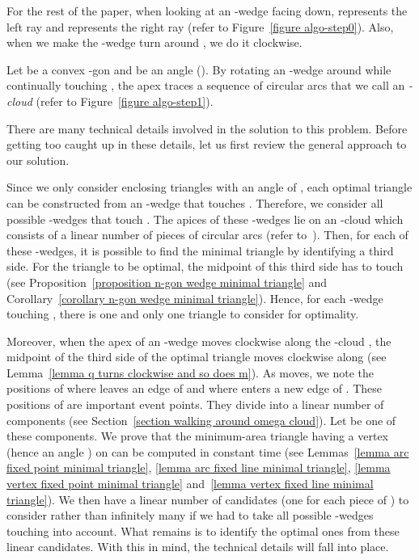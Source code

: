 \documentclass[11pt, oneside]{article}
\begin{document}
For the rest of the paper,
when looking at an -wedge facing down,
 represents the left ray and  represents the right ray
(refer to Figure~\ref{figure algo-step0}).
Also,
when we make the -wedge turn around ,
we do it clockwise.

\begin{definition}[-cloud]
Let  be a convex -gon
and  be an angle 
().
By rotating an -wedge around 
while continually touching ,
the apex traces a sequence of circular arcs
that we call an \emph{-cloud}
(refer to Figure~\ref{figure algo-step1}).
\end{definition}

There are many technical details involved 
in the solution to this problem.
Before getting too caught up in these details,
let us first review the general approach to our solution.

Since we only consider enclosing triangles 
with an angle of , 
each optimal triangle can be constructed 
from an -wedge that touches .
Therefore, 
we consider all possible -wedges that touch .
The apices of these -wedges
lie on an -cloud  which consists 
of a linear number of pieces of circular arcs 
(refer to~\cite{DBLP:journals/ijcga/BoseMSS11}).
Then, 
for each of these -wedges,
it is possible to find the minimal triangle
by identifying a third side.
For the triangle to be optimal,
the midpoint of this third side
has to touch 
(see Proposition~\ref{proposition n-gon wedge minimal triangle} 
and Corollary~\ref{corollary n-gon wedge minimal triangle}).
Hence,
for each -wedge touching ,
there is one and only one triangle to consider for optimality.

Moreover,
when the apex  of an -wedge 
moves clockwise along the -cloud ,
the midpoint  of the third side of the optimal triangle
moves clockwise along 
(see Lemma~\ref{lemma q turns clockwise and so does m}).
As  moves,
we note the positions of 
where  leaves an edge of 
and where  enters a new edge of .
These positions of  are important event points.
They divide  into a linear number of components
(see Section~\ref{section walking around omega cloud}).
Let  be one of these components.
We prove that the minimum-area triangle having a vertex 
(hence an angle ) on 
can be computed in constant time
(see Lemmas~\ref{lemma arc fixed point minimal triangle},
\ref{lemma arc fixed line minimal triangle},
\ref{lemma vertex fixed point minimal triangle}
and~\ref{lemma vertex fixed line minimal triangle}).
We then have a linear number of candidates
(one for each piece of )
to consider rather than infinitely many
if we had to take all possible 
-wedges touching  into account.
What remains is to identify
the optimal ones
from these linear candidates.
With this in mind,
the technical details will fall into place.
\end{document}
